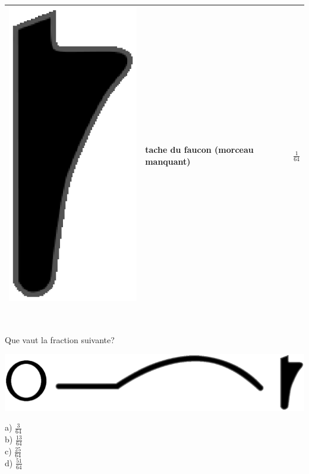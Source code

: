 \documentclass[letterpaper, 12pt]{article}
\begin{document}
\begin{center}
\begin{tabular}{|c|l|c|}
\includegraphics[scale=0.1]{faucon.eps} & tache du faucon (morceau manquant) & {\Large$\frac{1}{64}$}\\[2mm] \hline
\end{tabular}\\
\end{center}

Que vaut la fraction suivante?
\begin{center}
\includegraphics[scale=0.1]{fraction.eps}\\
\end{center}

a) $\frac{3}{64}$\\[2mm]
b) $\frac{13}{64}$\\[2mm]
c) $\frac{25}{64}$\\[2mm]
d) $\frac{51}{64}$\\[2mm]
\end{document}
